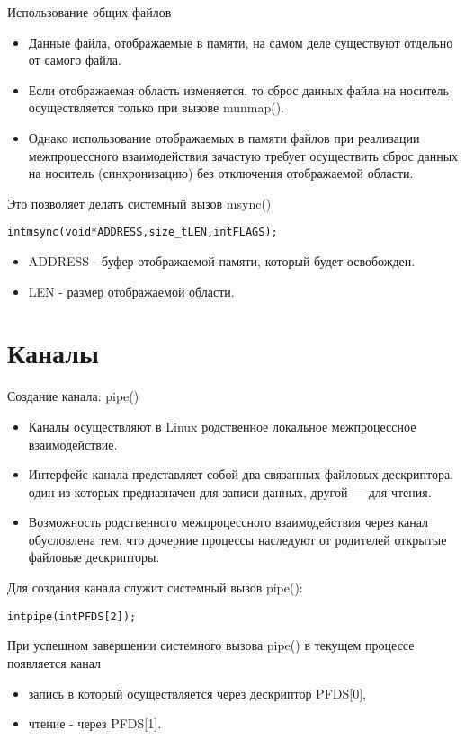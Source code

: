\documentclass{beamer}
\begin{document}
\begin{frame}[fragile]{Использование общих файлов}
\begin{itemize}
\item Данные файла, отображаемые в памяти, на самом деле существуют отдельно от самого файла. 
\item Если отображаемая область изменяется, то сброс данных файла на носитель осуществляется только при вызове munmap(). 
\item Однако использование отображаемых в памяти файлов при реализации межпроцессного взаимодействия зачастую требует осуществить сброс данных на носитель (синхронизацию) без отключения отображаемой области.
\end{itemize}
Это позволяет делать системный вызов msync()
\begin{alltt}
int msync (void * ADDRESS, size_t LEN, int FLAGS);
\end{alltt}
\begin{itemize}
\item ADDRESS - буфер отображаемой памяти, который будет освобожден.
\item LEN - размер отображаемой области.
\end{itemize}
\end{frame}

\section{Каналы}

\begin{frame}[fragile]{Создание канала: pipe()}
\begin{itemize}
\item Каналы осуществляют в Linux родственное локальное межпроцессное взаимодействие. 
\item Интерфейс канала представляет собой два связанных файловых дескриптора, один из которых предназначен для записи данных, другой — для чтения. 
\item Возможность родственного межпроцессного взаимодействия через канал обусловлена тем, что дочерние процессы наследуют от родителей открытые файловые дескрипторы.
\end{itemize}
Для создания канала служит системный вызов pipe():
\begin{alltt}
int pipe (int PFDS[2]);
\end{alltt}
При успешном завершении системного вызова pipe() в текущем процессе появляется канал
\begin{itemize}
\item запись в который осуществляется через дескриптор PFDS[0], 
\item чтение - через PFDS[1]. 
\end{itemize}
\end{frame}
\end{document}

